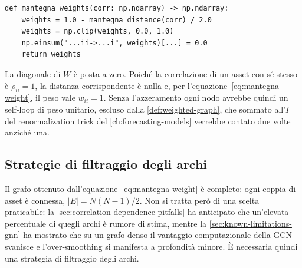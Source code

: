 \begin{listing}[H]
\begin{verbatim}
def mantegna_weights(corr: np.ndarray) -> np.ndarray:
    weights = 1.0 - mantegna_distance(corr) / 2.0
    weights = np.clip(weights, 0.0, 1.0)
    np.einsum("...ii->...i", weights)[...] = 0.0
    return weights
\end{verbatim}
\caption{\texttt{mantegna\_weights}}
\label{lst:mantegna-weights}
\end{listing}

La diagonale di $W$ è posta a zero. Poiché la correlazione di un asset con sé stesso è $\rho_{ii}=1$, la distanza corrispondente è nulla e, per l'equazione~\eqref{eq:mantegna-weight}, il peso vale $w_{ii}=1$. Senza l'azzeramento ogni nodo avrebbe quindi un self-loop di peso unitario, escluso dalla \cref{def:weighted-graph}, che sommato all'$I$ del renormalization trick del \cref{ch:forecasting-models} verrebbe contato due volte anziché una.

\subsection{Strategie di filtraggio degli archi}
\label{sec:edge-filtering-strategies}

Il grafo ottenuto dall'equazione~\eqref{eq:mantegna-weight} è completo: ogni coppia di asset è connessa, $|E| = N(N-1)/2$. Non si tratta però di una scelta praticabile: la \cref{sec:correlation-dependence-pitfalls} ha anticipato che un'elevata percentuale di quegli archi è rumore di stima, mentre la \cref{sec:known-limitations-gnn} ha mostrato che su un grafo denso il vantaggio computazionale della GCN svanisce e l'over-smoothing si manifesta a profondità minore. È necessaria quindi una strategia di filtraggio degli archi.

